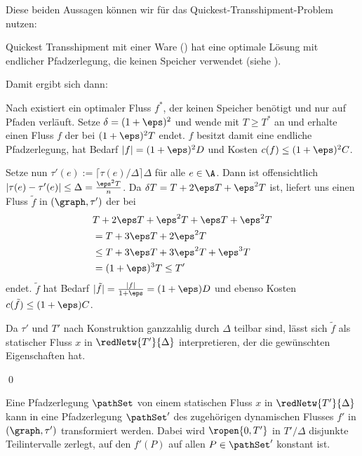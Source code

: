 Diese beiden Aussagen können wir für das Quickest-Transshipment-Problem
nutzen:
\begin{theorem}\label{theo:qtp_opt_flow}
    Quickest Transshipment mit einer Ware ()
    hat eine optimale Lösung mit endlicher Pfadzerlegung,
    die keinen Speicher verwendet (siehe \cite[Corollary 4.5]{fleischerSiam}).
\end{theorem}

Damit ergibt sich dann:
\begin{standaloneProof}
    Nach  existiert ein optimaler Fluss $f^*$, der
    keinen Speicher benötigt und nur auf Pfaden verläuft.
    Setze $\delta = (1 + \eps)^2$ und wende  mit
    $T \geq T^*$ an und erhalte einen Fluss $f$ der bei $(1 + \eps)^2 T$ endet.
    $f$ besitzt damit eine endliche Pfadzerlegung, hat Bedarf
    $|f| = (1 + \eps)^2 D$ und Kosten $c(f) \leq (1 + \eps)^2 C$.
    
    Setze nun $\tau'(e) := \lceil \tau(e) / \Delta \rceil \Delta$ für
    alle $e \in \A$. Dann ist offensichtlich
    $|\tau(e) - \tau'(e)| \leq \Delta = \frac{\eps^2 T}{n}$.
    Da $\delta T = T + 2 \eps T + \eps^2 T$ ist, liefert
     uns einen Fluss $\tilde{f}$ in $(\graph, \tau')$
    der bei
    \begin{align*}
        & T + 2 \eps T + \eps^2 T + \eps T + \eps^2 T \\
        & = T + 3 \eps T + 2 \eps^2 T \\
        & \leq T + 3 \eps T + 3 \eps^2 T + \eps^3 T \\
        & = (1 + \eps)^3 T \leq T'
    \end{align*}
    endet. $\tilde{f}$ hat Bedarf
    $|\tilde{f}| = \frac{|f|}{1+\eps} = (1 + \eps) D$ und ebenso
    Kosten $c(\tilde{f}) \leq (1 + \eps) C$.
    
    Da $\tau'$ und $T'$ nach Konstruktion ganzzahlig durch
    $\Delta$ teilbar sind, lässt sich $\tilde{f}$ als statischer Fluss $x$ in
    $\redNetw{T'}{\Delta}$ interpretieren, der die gewünschten
    Eigenschaften hat.
    
    \begin{flushright}\qed \end{flushright}
\end{standaloneProof}

\begin{lemma}\label{lem:path_decomp}
    Eine Pfadzerlegung $\pathSet$ von einem statischen Fluss $x$ in
    $\redNetw{T'}{\Delta}$ kann in eine Pfadzerlegung $\pathSet'$ des
    zugehörigen dynamischen Flusses $f'$ in $(\graph, \tau')$ 
    transformiert werden. Dabei wird $\ropen{0, T'}$ in $T'/\Delta$
    disjunkte Teilintervalle zerlegt, auf den $f'(P)$ auf allen $P \in \pathSet'$
    konstant ist.
\end{lemma}

